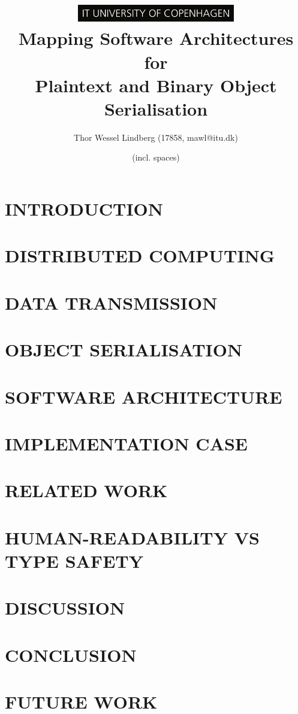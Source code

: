 \documentclass[10pt, twocolumn, letterpaper]{article}
\title{
    \includegraphics[height=0.75cm]{logo.jpg} \\
    \vspace{1.25cm}
    \Large \textbf{Mapping Software Architectures for}  \\
    \Large \textbf{Plaintext and Binary Object Serialisation}  \\
}
\author{Thor Wessel Lindberg (17858, mawl@itu.dk)}
\date{\charactercount{report} (incl. spaces)}
\begin{document}
\maketitle



\section{INTRODUCTION}


\section{DISTRIBUTED COMPUTING} %


\section{DATA TRANSMISSION} %


\section{OBJECT SERIALISATION} %


\section{SOFTWARE ARCHITECTURE} %


\section{IMPLEMENTATION CASE} %


\section{RELATED WORK} %


\section{HUMAN-READABILITY VS TYPE SAFETY} %


\section{DISCUSSION}


\section{CONCLUSION}


\section{FUTURE WORK}



\end{document}
